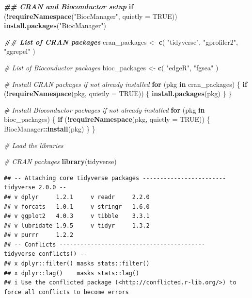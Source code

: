 \documentclass[
]{book}
\newenvironment{Shaded}{\begin{snugshade}}{\end{snugshade}}
\newcommand{\AttributeTok}[1]{\textcolor[rgb]{0.13,0.29,0.53}{#1}}
\newcommand{\CommentTok}[1]{\textcolor[rgb]{0.56,0.35,0.01}{\textit{#1}}}
\newcommand{\ConstantTok}[1]{\textcolor[rgb]{0.56,0.35,0.01}{#1}}
\newcommand{\ControlFlowTok}[1]{\textcolor[rgb]{0.13,0.29,0.53}{\textbf{#1}}}
\newcommand{\DocumentationTok}[1]{\textcolor[rgb]{0.56,0.35,0.01}{\textbf{\textit{#1}}}}
\newcommand{\FunctionTok}[1]{\textcolor[rgb]{0.13,0.29,0.53}{\textbf{#1}}}
\newcommand{\NormalTok}[1]{#1}
\newcommand{\OtherTok}[1]{\textcolor[rgb]{0.56,0.35,0.01}{#1}}
\newcommand{\SpecialCharTok}[1]{\textcolor[rgb]{0.81,0.36,0.00}{\textbf{#1}}}
\newcommand{\StringTok}[1]{\textcolor[rgb]{0.31,0.60,0.02}{#1}}
\begin{document}
\begin{Shaded}
\begin{Highlighting}[]
\DocumentationTok{\#\# CRAN and Bioconductor setup}
\ControlFlowTok{if}\NormalTok{ (}\SpecialCharTok{!}\FunctionTok{requireNamespace}\NormalTok{(}\StringTok{"BiocManager"}\NormalTok{, }\AttributeTok{quietly =} \ConstantTok{TRUE}\NormalTok{))}
  \FunctionTok{install.packages}\NormalTok{(}\StringTok{"BiocManager"}\NormalTok{)}

\DocumentationTok{\#\# List of CRAN packages}
\NormalTok{cran\_packages }\OtherTok{\textless{}{-}} \FunctionTok{c}\NormalTok{(}
  \StringTok{"tidyverse"}\NormalTok{,}
  \StringTok{"gprofiler2"}\NormalTok{,}
  \StringTok{"ggrepel"}
\NormalTok{)}

\CommentTok{\# List of Bioconductor packages}
\NormalTok{bioc\_packages }\OtherTok{\textless{}{-}} \FunctionTok{c}\NormalTok{(}
  \StringTok{"edgeR"}\NormalTok{,}
  \StringTok{"fgsea"}
\NormalTok{)}

\CommentTok{\# Install CRAN packages if not already installed}
\ControlFlowTok{for}\NormalTok{ (pkg }\ControlFlowTok{in}\NormalTok{ cran\_packages) \{}
  \ControlFlowTok{if}\NormalTok{ (}\SpecialCharTok{!}\FunctionTok{requireNamespace}\NormalTok{(pkg, }\AttributeTok{quietly =} \ConstantTok{TRUE}\NormalTok{)) \{}
    \FunctionTok{install.packages}\NormalTok{(pkg)}
\NormalTok{  \}}
\NormalTok{\}}

\CommentTok{\# Install Bioconductor packages if not already installed}
\ControlFlowTok{for}\NormalTok{ (pkg }\ControlFlowTok{in}\NormalTok{ bioc\_packages) \{}
  \ControlFlowTok{if}\NormalTok{ (}\SpecialCharTok{!}\FunctionTok{requireNamespace}\NormalTok{(pkg, }\AttributeTok{quietly =} \ConstantTok{TRUE}\NormalTok{)) \{}
\NormalTok{    BiocManager}\SpecialCharTok{::}\FunctionTok{install}\NormalTok{(pkg)}
\NormalTok{  \}}
\NormalTok{\}}

\CommentTok{\# Load the libraries}

\CommentTok{\# CRAN packages}
\FunctionTok{library}\NormalTok{(tidyverse)}
\end{Highlighting}
\end{Shaded}

\begin{verbatim}
## -- Attaching core tidyverse packages ------------------------ tidyverse 2.0.0 --
## v dplyr     1.2.1     v readr     2.2.0
## v forcats   1.0.1     v stringr   1.6.0
## v ggplot2   4.0.3     v tibble    3.3.1
## v lubridate 1.9.5     v tidyr     1.3.2
## v purrr     1.2.2     
## -- Conflicts ------------------------------------------ tidyverse_conflicts() --
## x dplyr::filter() masks stats::filter()
## x dplyr::lag()    masks stats::lag()
## i Use the conflicted package (<http://conflicted.r-lib.org/>) to force all conflicts to become errors
\end{verbatim}
\end{document}
